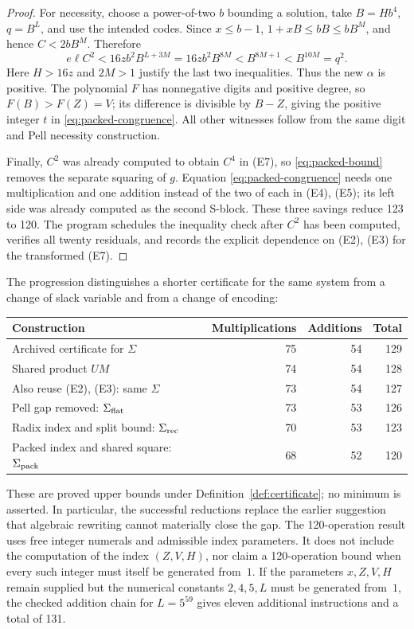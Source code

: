 \begin{proof}
For necessity, choose a power-of-two $b$ bounding a solution, take
$B=Hb^4$, $q=B^L$, and use the intended codes. Since $x\le b-1$,
$1+xB\le bB\le bB^M$, and hence $C<2bB^M$. Therefore
\[
 e\ell C^2<16zb^2B^{L+3M}
       =16zb^2B^{8M}<B^{8M+1}<B^{10M}=q^2.
\]
Here $H>16z$ and $2M>1$ justify the last two inequalities. Thus the
new $\alpha$ is positive. The polynomial $F$ has nonnegative digits
and positive degree, so $F(B)>F(Z)=V$; its difference is divisible by
$B-Z$, giving the positive integer $t$ in
\eqref{eq:packed-congruence}. All other witnesses follow from the same
digit and Pell necessity construction.

Finally, $C^2$ was already computed to obtain $C^4$ in (E7), so
\eqref{eq:packed-bound} removes the separate squaring of $g$. Equation
\eqref{eq:packed-congruence} needs one multiplication and one addition
instead of the two of each in (E4), (E5); its left side was already
computed as the second S-block. These three savings reduce 123 to 120.
The program schedules the inequality check after $C^2$ has been
computed, verifies all twenty residuals, and records the explicit
dependence on (E2), (E3) for the transformed (E7).
\end{proof}

\medskip
\noindent The progression distinguishes a shorter certificate for the
same system from a change of slack variable and from a change of encoding:
\begin{center}
\begin{tabular}{@{}lrrr@{}}
\toprule
Construction & Multiplications & Additions & Total\\
\midrule
Archived certificate for $\Sigma$ &75&54&129\\
Shared product $UM$ &74&54&128\\
Also reuse (E2), (E3): same $\Sigma$ &73&54&127\\
Pell gap removed: $\Sigma_{\rm flat}$ &73&53&126\\
Radix index and split bound: $\Sigma_{\rm rec}$ &70&53&123\\
Packed index and shared square: $\Sigma_{\rm pack}$ &68&52&120\\
\bottomrule
\end{tabular}
\end{center}
These are proved upper bounds under Definition~\ref{def:certificate};
no minimum is asserted. In particular, the successful reductions replace
the earlier suggestion that algebraic rewriting cannot materially close
the gap. The 120-operation result uses free integer numerals and
admissible index parameters. It does not include the computation of the
index $(Z,V,H)$, nor claim a 120-operation bound when every such integer
must itself be generated from~$1$. If the parameters $x,Z,V,H$ remain
supplied but the numerical constants $2,4,5,L$ must be generated from~$1$,
the checked addition chain for $L=5^{59}$ gives eleven additional
instructions and a total of 131.

